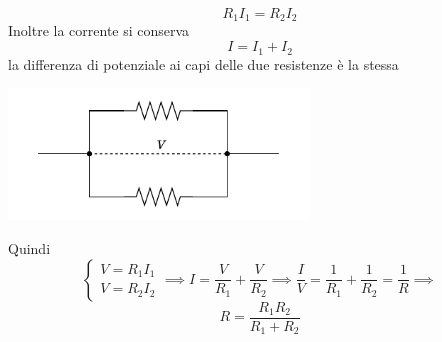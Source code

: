 \documentclass[10pt, letterpaper]{report}
\begin{document}
$$R_1I_1=R_2I_2 $$
Inoltre la corrente si conserva 
$$ I=I_1+I_2$$
la differenza di potenziale ai capi delle due resistenze è la stessa \begin{center}
    \includegraphics[width=0.6\textwidth]{images/resistenzeParallelo2.pdf}
\end{center}
Quindi 
$$ \begin{cases}
    V=R_1I_1\\ 
    V=R_2I_2
\end{cases}\implies 
I=\frac{V}{R_1}+\frac{V}{R_2}\implies \frac{I}{V}=\frac{1}{R_1}+\frac{1}{R_2}=\frac{1}{R}\implies $$
$$ R=\frac{R_1R_2}{R_1+R_2}$$
\flowerLine 
\end{document}
